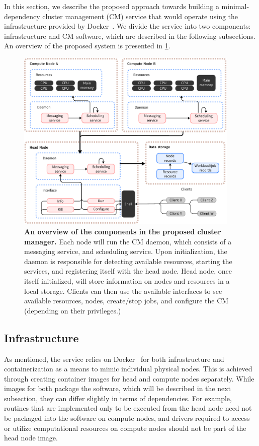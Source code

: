 \documentclass[sigconf]{acmart}
\begin{document}
In this section, we describe the proposed approach towards building a minimal-dependency cluster management (CM) service that
would operate using the infrastructure provided by Docker~\cite{merkel2014docker}.
We divide the service into two components: infrastructure and CM software, which are described in the following subsections.
An overview of the proposed system is presented in \cref{fig:overview}.

\begin{figure}[ht]
    \centering
    \includegraphics[width=0.95\textwidth]{figures/overview.pdf}
    \caption{
        \textbf{An overview of the components in the proposed cluster manager.}
        Each node will run the CM daemon, which consists of a messaging service, and scheduling service.
        Upon initialization, the daemon is responsible for detecting available resources, starting the services, and registering
        itself with the head node. Head node, once itself initialized, will store information on nodes and resources in a local
        storage. Clients can then use the available interfaces to see available resources, nodes, create/stop jobs, and
        configure the CM (depending on their privileges.)
    }
    \label{fig:overview}
\end{figure}

\subsection{Infrastructure}
As mentioned, the service relies on Docker~\cite{merkel2014docker} for both infrastructure and containerization as a means to
mimic individual physical nodes.
This is achieved through creating container images for head and compute nodes separately.
While images for both package the software, which will be described in the next subsection, they can differ slightly in terms of
dependencies. For example, routines that are implemented only to be executed from the head node need not be packaged into the
software on compute nodes, and drivers required to access or utilize computational resources on compute nodes should not be part
of the head node image.
\end{document}
